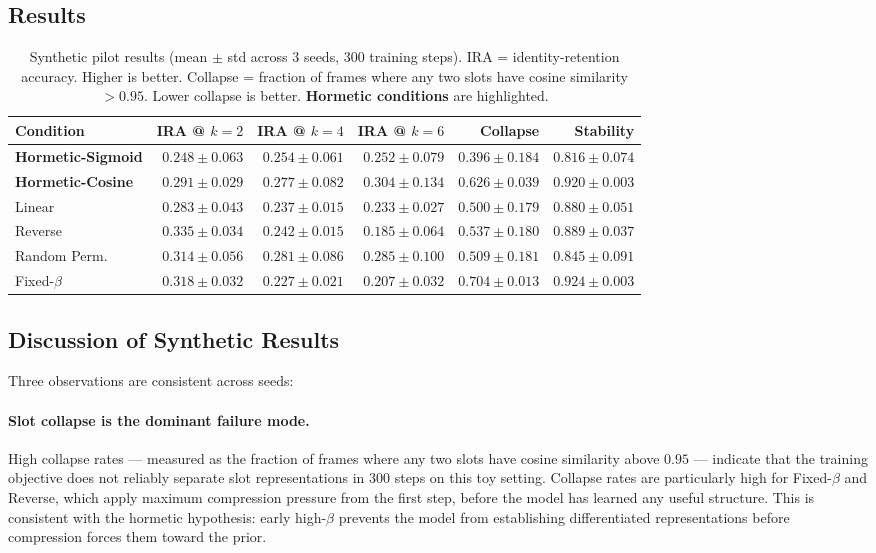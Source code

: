 \documentclass{article}
\begin{document}
\subsection{Results}

\begin{table}[h]
  \centering
  \caption{%
    Synthetic pilot results (mean $\pm$ std across 3 seeds, 300 training steps).
    IRA = identity-retention accuracy. Higher is better.
    Collapse = fraction of frames where any two slots have cosine similarity $>0.95$.
    Lower collapse is better.
    \textbf{Hormetic conditions} are highlighted.
  }
  \label{tab:results}
  \small
  \begin{tabular}{lrrrrr}
    \toprule
    Condition & IRA @ $k=2$ & IRA @ $k=4$ & IRA @ $k=6$ & Collapse & Stability \\
    \midrule
            \textbf{Hormetic-Sigmoid} & $0.248 \pm 0.063$ & $0.254 \pm 0.061$ & $0.252 \pm 0.079$ & $0.396 \pm 0.184$ & $0.816 \pm 0.074$ \\
    \textbf{Hormetic-Cosine} & $0.291 \pm 0.029$ & $0.277 \pm 0.082$ & $0.304 \pm 0.134$ & $0.626 \pm 0.039$ & $0.920 \pm 0.003$ \\
    Linear & $0.283 \pm 0.043$ & $0.237 \pm 0.015$ & $0.233 \pm 0.027$ & $0.500 \pm 0.179$ & $0.880 \pm 0.051$ \\
    Reverse & $0.335 \pm 0.034$ & $0.242 \pm 0.015$ & $0.185 \pm 0.064$ & $0.537 \pm 0.180$ & $0.889 \pm 0.037$ \\
    Random Perm. & $0.314 \pm 0.056$ & $0.281 \pm 0.086$ & $0.285 \pm 0.100$ & $0.509 \pm 0.181$ & $0.845 \pm 0.091$ \\
    Fixed-$\beta$ & $0.318 \pm 0.032$ & $0.227 \pm 0.021$ & $0.207 \pm 0.032$ & $0.704 \pm 0.013$ & $0.924 \pm 0.003$ \\
    \bottomrule
  \end{tabular}
\end{table}

\subsection{Discussion of Synthetic Results}

Three observations are consistent across seeds:

\paragraph{Slot collapse is the dominant failure mode.}
High collapse rates --- measured as the fraction of frames where any two slots
have cosine similarity above $0.95$ --- indicate that the training objective
does not reliably separate slot representations in 300 steps on this toy setting.
Collapse rates are particularly high for Fixed-$\beta$ and Reverse, which apply
maximum compression pressure from the first step, before the model has learned
any useful structure.
This is consistent with the hormetic hypothesis: early high-$\beta$ prevents
the model from establishing differentiated representations before compression
forces them toward the prior.
\end{document}
